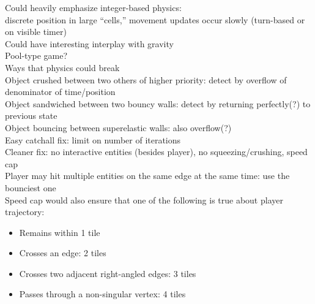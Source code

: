 \documentclass{article}
\begin{document}
Could heavily emphasize integer-based physics: \\
discrete position in large ``cells,''
movement updates occur slowly (turn-based or on visible timer) \\
Could have interesting interplay with gravity \\
Pool-type game? \\

Ways that physics could break \\
Object crushed between two others of higher priority:
detect by overflow of denominator of time/position \\
Object sandwiched between two bouncy walls:
detect by returning perfectly(?) to previous state \\
Object bouncing between superelastic walls: also overflow(?) \\
Easy catchall fix: limit on number of iterations \\
Cleaner fix: no interactive entities (besides player),
no squeezing/crushing, speed cap \\
Player may hit multiple entities on the same edge at the same time:
use the bounciest one \\
Speed cap would also ensure that one of the following is true
about player trajectory:
\begin{itemize}
\item
  Remains within 1 tile
\item
  Crosses an edge: 2 tiles
\item
  Crosses two adjacent right-angled edges: 3 tiles
\item
  Passes through a non-singular vertex: 4 tiles
\end{itemize}
\end{document}

